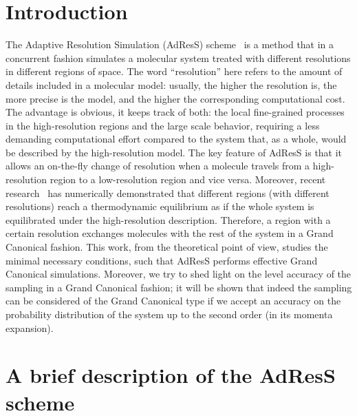 \documentclass[aip,jcp,a4paper,reprint,onecolumn]{revtex4-1}
\begin{document}
\section{Introduction}
The Adaptive Resolution Simulation (AdResS) scheme~\cite{jcp,pre} is a
method that in a concurrent fashion simulates a molecular system treated with different
resolutions in different regions of space.  The word ``resolution''
here refers to the amount of details included in a molecular model: usually, the higher the
resolution is, the more precise is the model, and the higher the corresponding computational cost.  The advantage is obvious, it
keeps track of both: the local fine-grained processes in the
high-resolution regions and the large scale behavior, requiring a less demanding computational effort compared to the system that, as a
whole, would be described by the high-resolution model. The key feature of
AdResS is that it allows an on-the-fly change of resolution when a
molecule travels from a high-resolution region to a low-resolution
region and vice versa. Moreover, recent research~\cite{prlgc, rdfcorr}
has numerically demonstrated that different regions (with different resolutions) reach a
thermodynamic equilibrium as if the whole system is equilibrated
under the high-resolution description. Therefore, a region with a
certain resolution exchanges molecules with the rest of the system in
a Grand Canonical fashion. This work, from the theoretical point of
view, studies the minimal necessary conditions, such that AdResS
performs effective Grand Canonical simulations. Moreover, we try to shed light on the level accuracy of
the sampling in a Grand Canonical fashion; it will be shown that indeed the sampling can be considered 
of the Grand Canonical type if we accept an accuracy on the probability distribution of the system up to the second order (in its momenta expansion).

\section{A brief description of the AdResS scheme}
\end{document}
